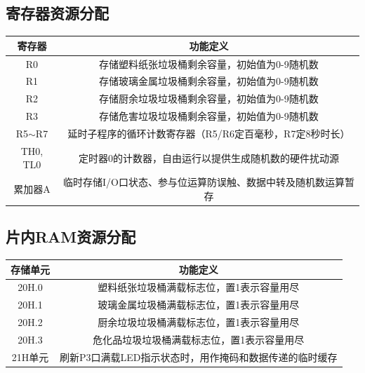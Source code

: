\documentclass[12pt,a4paper]{article}
\begin{document}
\subsection{寄存器资源分配}
\begin{table}[H]
    \centering
    \small
    \begin{tabular}{|c|c|}
        \hline
        寄存器 & 功能定义 \\
        \hline
        R0 & 存储塑料纸张垃圾桶剩余容量，初始值为0-9随机数 \\
        \hline
        R1 & 存储玻璃金属垃圾桶剩余容量，初始值为0-9随机数 \\
        \hline
        R2 & 存储厨余垃圾垃圾桶剩余容量，初始值为0-9随机数 \\
        \hline
        R3 & 存储危害垃圾垃圾桶剩余容量，初始值为0-9随机数 \\
        \hline
        R5$\sim$R7 & 延时子程序的循环计数寄存器（R5/R6定百毫秒，R7定8秒时长） \\
        \hline
        TH0, TL0 & 定时器0的计数器，自由运行以提供生成随机数的硬件扰动源 \\
        \hline
        累加器A & 临时存储I/O口状态、参与位运算防误触、数据中转及随机数运算暂存 \\
        \hline
    \end{tabular}
\end{table}

\subsection{片内RAM资源分配}
\begin{table}[H]
    \centering
    \small
    \begin{tabular}{|c|c|}
        \hline
        存储单元 & 功能定义 \\
        \hline
        20H.0 & 塑料纸张垃圾桶满载标志位，置1表示容量用尽 \\
        \hline
        20H.1 & 玻璃金属垃圾桶满载标志位，置1表示容量用尽 \\
        \hline
        20H.2 & 厨余垃圾垃圾桶满载标志位，置1表示容量用尽 \\
        \hline
        20H.3 & 危化品垃圾垃圾桶满载标志位，置1表示容量用尽 \\
        \hline
        21H单元 & 刷新P3口满载LED指示状态时，用作掩码和数据传递的临时缓存 \\
        \hline
    \end{tabular}
\end{table}
\end{document}
